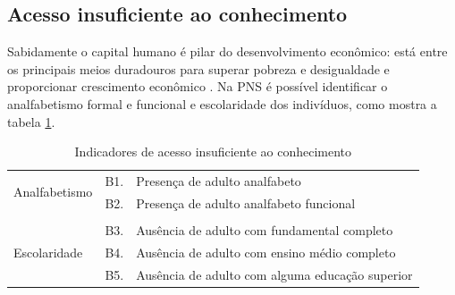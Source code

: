 \documentclass[
	12pt,				%
	openright,			%
	twoside,			%
	a4paper,			%
	english,			%
	french,				%
	spanish,			%
	brazil				%
	]{abntex2}
\begin{document}
\begin{table}[H]
	\centering
	\caption{Indicadores de vulnerabilidade familiar}
	\label{ind_vulnerabilidade}
\end{table}

 \subsection{Acesso insuficiente ao conhecimento}
 Sabidamente o capital humano é pilar do desenvolvimento econômico: está entre os principais meios duradouros para superar pobreza e desigualdade e proporcionar crescimento econômico . Na PNS é possível identificar o analfabetismo formal e funcional e escolaridade dos indivíduos, como mostra a tabela \ref{ind_conhecimento}.
 
 \begin{table}[H]
 	\footnotesize
 	\centering
 	\caption{Indicadores de acesso insuficiente ao conhecimento}
 	\label{ind_conhecimento}
 	\begin{tabular}{m{7cm}ll}
 		\hline
 		\multirow{2}{*}{Analfabetismo} & B1. & Presença de adulto analfabeto                   \\
 		& B2. & Presença de adulto analfabeto funcional         \\
 		&     &                                                 \\
 		\multirow{3}{*}{Escolaridade}  & B3. & Ausência de adulto com fundamental completo     \\
 		& B4. & Ausência de adulto com ensino médio completo    \\
 		& B5. & Ausência de adulto com alguma educação superior \\ \hline
 	\end{tabular}
 \end{table}
\end{document}
